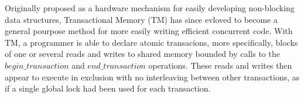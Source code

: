 \documentclass[11pt,letterpaper]{article}
\begin{document}
\newlength {\squarewidth}
\renewenvironment {square}
{
\setlength {\squarewidth} {\linewidth}
\addtolength {\squarewidth} {-12pt}
\renewcommand{\baselinestretch}{0.75} \footnotesize
\begin {center}
\begin {tabular} {|c|} \hline
\begin {minipage} {\squarewidth}
\medskip
}{
\end {minipage}
\\ \hline
\end{tabular}
\end{center}
}  
 
\newtheorem{definition}{Definition}
\newtheorem{theorem}{Theorem}
\newtheorem{lemma}{Lemma}
\newtheorem{corollary}{Corollary}
\newcommand{\toto}{xxx}
\newenvironment{proofT}{\noindent{\bf
Proof }} {\hspace*{\fill}$\Box_{Theorem~\ref{\toto}}$\par\vspace{3mm}}
\newenvironment{proofL}{\noindent{\bf
Proof }} {\hspace*{\fill}$\Box_{Lemma~\ref{\toto}}$\par\vspace{3mm}}
\newenvironment{proofC}{\noindent{\bf
Proof }} {\hspace*{\fill}$\Box_{Corollary~\ref{\toto}}$\par\vspace{3mm}}


\newcommand{\linenumbering}{\ifthenelse{\value{linecounter}<10}
{(0\arabic{linecounter})}{(\arabic{linecounter})}}
\renewcommand{\line}[1]{\refstepcounter{linecounter}\label{#1}\linenumbering}
\newcommand{\resetline}[1]{\setcounter{linecounter}{0}#1}
\renewcommand{\thelinecounter}{\ifnum \value{linecounter} > 
9\else 0\fi \arabic{linecounter}}

\newcommand{\tuple}[1]{\ensuremath{\left \langle #1 \right \rangle }}


Originally proposed as a hardware mechanism for easily developing non-blocking data structures,
Transactional Memory (TM) has since evloved to become a general pourpose method for more easily writing
efficient concurrent code.
With TM, a programmer is able to declare atomic transacions, more specifically, blocks
of one or several reads and writes to shared memory bounded by calls to the
$\mathit{begin\_transaction}$ and $\mathit{end\_transaction}$ operations.
These reads and writes then appear to execute in exclusion with no interleaving
between other transactions, as if a single global lock had been used for each transaction.
\end{document}
